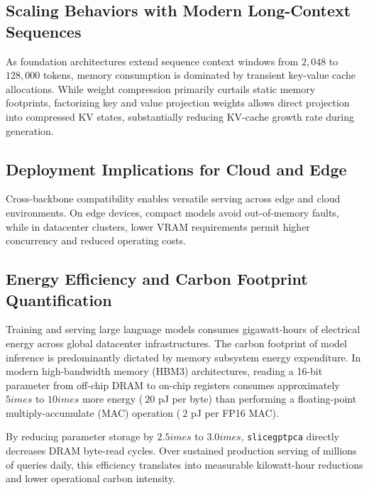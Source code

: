 \subsection{Scaling Behaviors with Modern Long-Context Sequences}
As foundation architectures extend sequence context windows from $2{,}048$ to $128{,}000$ tokens, memory consumption is dominated by transient key-value cache allocations. While weight compression primarily curtails static memory footprints, factorizing key and value projection weights allows direct projection into compressed KV states, substantially reducing KV-cache growth rate during generation.

\subsection{Deployment Implications for Cloud and Edge}
Cross-backbone compatibility enables versatile serving across edge and cloud environments. On edge devices, compact models avoid out-of-memory faults, while in datacenter clusters, lower VRAM requirements permit higher concurrency and reduced operating costs.

\subsection{Energy Efficiency and Carbon Footprint Quantification}
Training and serving large language models consumes gigawatt-hours of electrical energy across global datacenter infrastructures. The carbon footprint of model inference is predominantly dictated by memory subsystem energy expenditure. In modern high-bandwidth memory (HBM3) architectures, reading a 16-bit parameter from off-chip DRAM to on-chip registers consumes approximately $5	imes$ to $10	imes$ more energy ($~20$ pJ per byte) than performing a floating-point multiply-accumulate (MAC) operation ($~2$ pJ per FP16 MAC).

By reducing parameter storage by $2.5	imes$ to $3.0	imes$, \texttt{slicegptpca} directly decreases DRAM byte-read cycles. Over sustained production serving of millions of queries daily, this efficiency translates into measurable kilowatt-hour reductions and lower operational carbon intensity.
